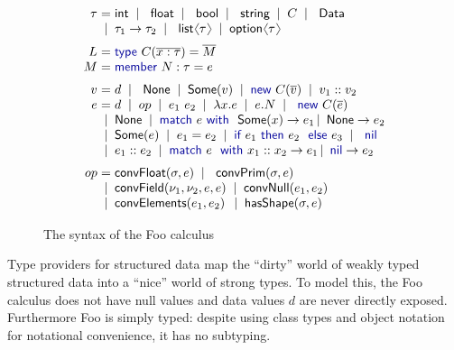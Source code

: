 \documentclass[pldi-cameraready]{sigplanconf-pldi16}
\newcommand{\langl}{\begin{picture}(4.5,7)
\put(1.1,2.5){\rotatebox{60}{\line(1,0){5.5}}}
\put(1.1,2.5){\rotatebox{300}{\line(1,0){5.5}}}
\end{picture}}
\newcommand{\rangl}{\begin{picture}(4.5,7)
\put(.9,2.5){\rotatebox{120}{\line(1,0){5.5}}}
\put(.9,2.5){\rotatebox{240}{\line(1,0){5.5}}}
\end{picture}}
\newcommand{\kvd}[1]{\textnormal{\textcolor{kvdclr}{\sffamily #1}}}
\newcommand{\ident}[1]{\textnormal{\sffamily #1}}
\newcommand{\lsep}[0]{\;\; | \;\;}
\newcommand{\narrow}[1]{\hspace{-0.7em} #1 \hspace{-0.7em}}
\begin{document}
\begin{figure}[!h]
\vspace{-0.1em}
\noindent
\begin{equation*}
\begin{array}{rcl}
 \tau &\narrow{=}& \ident{int} \lsep \ident{float} \lsep \ident{bool} \lsep \ident{string} \lsep C \lsep \ident{Data} \\[0.0em]
      &\narrow{|}& \tau_1 \rightarrow \tau_2 \lsep \ident{list}\langl\tau\rangl \lsep \ident{option}\langl\tau\rangl
\\[0.6em]
 L &\narrow{=}& \kvd{type}~C(\overline{x:\tau}) = \overline{M} \\[0.0em]
 M &\narrow{=}& \kvd{member}~N:\tau= e
\\[0.6em]
 v &\narrow{=}& d \lsep \ident{None} \lsep \ident{Some}(v) \lsep \kvd{new}~C(\overline{v}) \lsep v_1::v_2 \\[0.0em]
 e &\narrow{=}& d \lsep op \lsep e_1~e_2 \lsep \lambda x.e \lsep e.N \lsep \kvd{new}~C(\overline{e}) \\
   &\narrow{|}& \ident{None} \lsep\kvd{match}~e~\kvd{with}~\ident{Some}(x) \rightarrow e_1 \,|\, \ident{None} \rightarrow e_2 \\
   &\narrow{|}& \ident{Some}(e) \lsep e_1 = e_2 \lsep {\kvd{if}~e_1~\kvd{then}~e_2~\kvd{else}~e_3} \lsep \kvd{nil} \\
   &\narrow{|}& e_1 :: e_2 \lsep \kvd{match}~e~\kvd{with}~x_1::x_2 \rightarrow e_1 \,|\, \kvd{nil} \rightarrow e_2
\\[0.6em]
op &\narrow{=}& \ident{convFloat}(\sigma, e) \lsep \ident{convPrim}(\sigma, e) \\
   &\narrow{|}& \ident{convField}(\nu_1, \nu_2, e, e) \lsep \ident{convNull}(e_1, e_2) \\
   &\narrow{|}& \ident{convElements}(e_1, e_2) \,\lsep \ident{hasShape}(\sigma, e)
\end{array}
\end{equation*}

\caption{The syntax of the Foo calculus}
\label{fig:foo-syntax}
\vspace{-0.5em}
\end{figure}


Type providers for structured data map the ``dirty'' world of weakly typed
structured data into a ``nice'' world of strong types. To model this, the Foo calculus
does not have \kvd{null} values and data values $d$ are never directly exposed.
Furthermore Foo is simply typed: despite using class types and object notation
for notational convenience, it has no subtyping.
\end{document}

